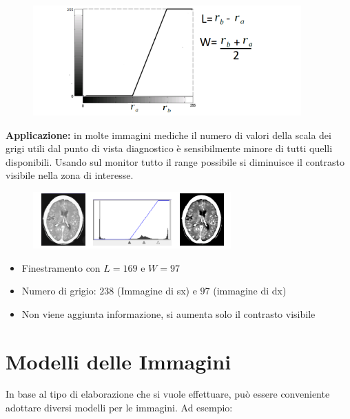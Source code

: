 \begin{figure}[H]
    \centering
    \includegraphics[width=\linewidth, keepaspectratio]{capitoli/immagini/imgs/win1.png}
\end{figure}

\textbf{Applicazione:} in molte immagini mediche il numero di valori della
scala dei grigi utili dal punto di vista diagnostico è sensibilmente
minore di tutti quelli disponibili. Usando sul monitor tutto il range
possibile si diminuisce il contrasto visibile nella zona di interesse.

\begin{figure}[H]
    \centering
    \includegraphics[width=\linewidth, keepaspectratio]{capitoli/immagini/imgs/windowing.png}
\end{figure}

\begin{itemize}
    \item Finestramento con $L = 169$ e $W = 97$
    \item Numero di grigio: $238$ (Immagine di sx) e $97$ (immagine di dx)
    \item Non viene aggiunta informazione, si aumenta solo il contrasto visibile
\end{itemize}

\section{Modelli delle Immagini}
In base al tipo di elaborazione che si vuole effettuare, può essere conveniente adottare diversi modelli per le immagini. Ad esempio:

